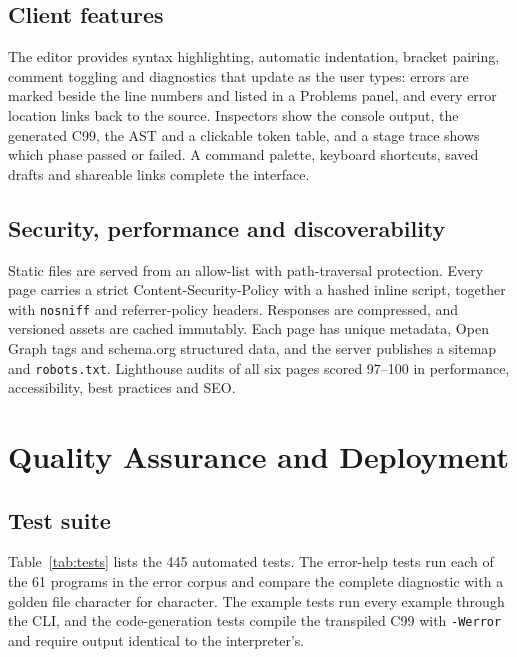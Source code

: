 \documentclass[conference]{IEEEtran}
\begin{document}
\subsection{Client features}
The editor provides syntax highlighting, automatic indentation, bracket pairing, comment toggling and
diagnostics that update as the user types: errors are marked beside the line numbers and listed in a
Problems panel, and every error location links back to the source. Inspectors show the console output, the
generated C99, the AST and a clickable token table, and a stage trace shows which phase passed or failed.
A command palette, keyboard shortcuts, saved drafts and shareable links complete the interface.

\subsection{Security, performance and discoverability}
Static files are served from an allow-list with path-traversal protection. Every page carries a strict
Content-Security-Policy with a hashed inline script, together with \texttt{nosniff} and referrer-policy
headers. Responses are compressed, and versioned assets are cached immutably. Each page has unique metadata,
Open Graph tags and schema.org structured data, and the server publishes a sitemap and \texttt{robots.txt}.
Lighthouse audits of all six pages scored 97--100 in performance, accessibility, best practices and SEO.

\section{Quality Assurance and Deployment}\label{sec:qa}
\subsection{Test suite}
Table~\ref{tab:tests} lists the 445 automated tests. The error-help tests run each of the 61 programs in the
error corpus and compare the complete diagnostic with a golden file character for character. The example
tests run every example through the CLI, and the code-generation tests compile the transpiled C99 with
\texttt{-Werror} and require output identical to the interpreter's.
\end{document}
